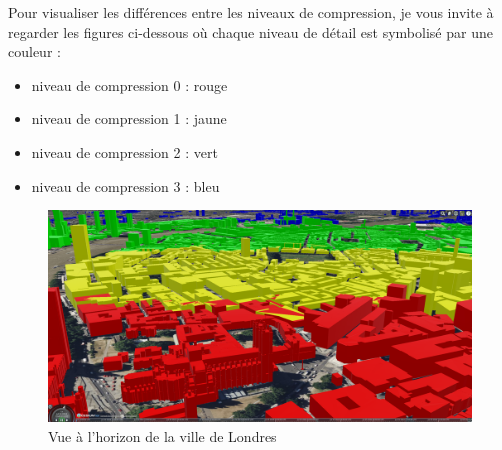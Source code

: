 Pour visualiser les différences entre les niveaux de compression, je vous invite à regarder les figures ci-dessous où chaque niveau de détail est symbolisé par une couleur :

\begin{itemize}
    \item niveau de compression 0 : rouge
    \item niveau de compression 1 : jaune
    \item niveau de compression 2 : vert
    \item niveau de compression 3 : bleu
\end{itemize}


\begin{figure}[H]
    \centering
    \includegraphics[width=1\textwidth]{assets/figures/lods-horizon.png}
    \caption{Vue à l'horizon de la ville de Londres}
    \label{fig:lods-horizon}
\end{figure}


